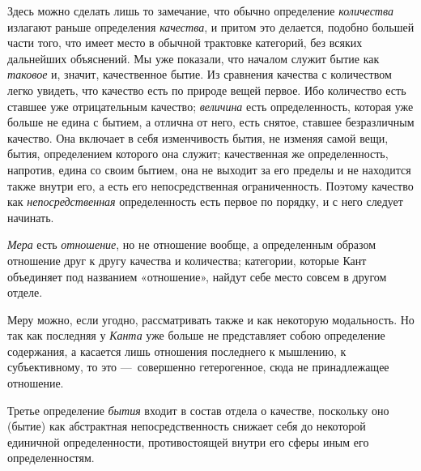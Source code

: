 Здесь можно сделать лишь то замечание, что обычно определение
{\em количества} излагают раньше определения
{\em качества}, и притом это делается, подобно большей
части того, что имеет место в обычной трактовке категорий, без всяких
дальнейших объяснений. Мы уже показали, что началом служит бытие как
{\em таковое} и, значит, качественное бытие. Из
сравнения качества с количеством легко увидеть, что качество есть по
природе вещей первое. Ибо количество есть ставшее уже отрицательным
качество; {\em величина} есть определенность, которая
уже больше не едина с бытием, а отлична от него, есть снятое, ставшее
безразличным качество. Она включает в себя изменчивость бытия, не изменяя
самой вещи, бытия, определением которого она служит; качественная же
определенность, напротив, едина со своим бытием, она не выходит за его
пределы и не находится также внутри его, а есть его непосредственная
ограниченность. Поэтому качество как
{\em непосредственная} определенность есть первое по
порядку, и с него следует начинать.

{\em Мера} есть {\em отношение}, но
не отношение вообще, а определенным образом отношение друг к другу качества
и количества; категории, которые Кант объединяет под названием «отношение»,
найдут себе место совсем в другом отделе.

Меру можно, если угодно, рассматривать также и как некоторую модальность. Но
так как последняя у {\em Канта} уже больше не
представляет собою определение содержания, а касается лишь отношения
последнего к мышлению, к субъективному, то это —~совершенно гетерогенное,
сюда не принадлежащее отношение.

Третье определение {\em бытия} входит в состав отдела о
качестве, поскольку оно (бытие) как абстрактная непосредственность снижает
себя до некоторой единичной определенности, противостоящей внутри его сферы
иным его определенностям.

\bigskip
